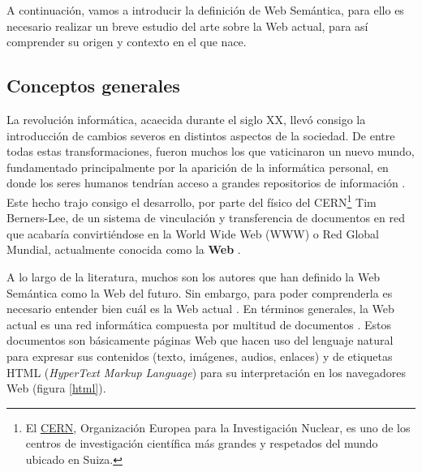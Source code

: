 A continuación, vamos a introducir la definición de Web Semántica, para ello es necesario realizar un breve estudio del arte sobre la Web actual, para así comprender su origen y contexto en el que nace.

\subsection{Conceptos generales}


La revolución informática, acaecida durante el siglo XX, llevó consigo la introducción de cambios severos en distintos aspectos de la sociedad. De entre todas estas transformaciones, fueron muchos los que vaticinaron un nuevo mundo, fundamentado principalmente por la aparición de la informática personal, en donde los seres humanos tendrían acceso a grandes repositorios de información \cite{semantica-web}. Este hecho trajo consigo el desarrollo, por parte del físico del CERN\footnote{El \href{https://home.cern}{CERN}, Organización Europea para la Investigación Nuclear, es uno de los centros de investigación científica más grandes y respetados del mundo ubicado en Suiza.} Tim Berners-Lee, de un sistema de vinculación y transferencia de documentos en red que acabaría convirtiéndose en la World Wide Web (WWW) o Red Global Mundial, actualmente conocida como la \textbf{Web} \cite{tesis}.

A lo largo de la literatura, muchos son los autores que han definido la Web Semántica como la Web del futuro. Sin embargo, para poder comprenderla es necesario entender bien cuál es la Web actual \cite{researchgate}. En términos generales, la Web actual es una red informática compuesta por multitud de documentos \cite{coursera}. Estos documentos son básicamente páginas Web que hacen uso del lenguaje natural para expresar sus contenidos (texto, imágenes, audios, enlaces) y de etiquetas HTML (\textit{HyperText Markup Language}) para su interpretación en los navegadores Web (figura \ref{html}). 

